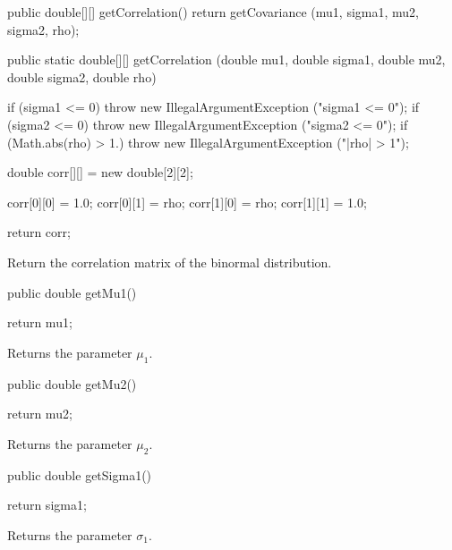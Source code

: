 \begin{code}\begin{hide}

   public double[][] getCorrelation() {
      return getCovariance (mu1, sigma1, mu2, sigma2, rho);
   }\end{hide}

   public static double[][] getCorrelation (double mu1, double sigma1,
                                            double mu2, double sigma2,
                                            double rho)\begin{hide} {
      if (sigma1 <= 0)
         throw new IllegalArgumentException ("sigma1 <= 0");
      if (sigma2 <= 0)
         throw new IllegalArgumentException ("sigma2 <= 0");
      if (Math.abs(rho) > 1.)
         throw new IllegalArgumentException ("|rho| > 1");

      double corr[][] = new double[2][2];

      corr[0][0] = 1.0;
      corr[0][1] = rho;
      corr[1][0] = rho;
      corr[1][1] = 1.0;

      return corr;
   }\end{hide}
\end{code}
\begin{tabb}
   Return the correlation matrix of the binormal distribution.
\end{tabb}
\begin{code}
   
   public double getMu1() \begin{hide} {
      return mu1;
   }\end{hide}
\end{code}
  \begin{tabb} Returns the parameter $\mu_1$.
  \end{tabb}
\begin{code}
   
   public double getMu2() \begin{hide} {
      return mu2;
   }\end{hide}
\end{code}
  \begin{tabb} Returns the parameter $\mu_2$.
  \end{tabb}
\begin{code}

   public double getSigma1() \begin{hide} {
      return sigma1;
   }\end{hide}
\end{code}
\begin{tabb} Returns the parameter $\sigma_1$.
\end{tabb}
